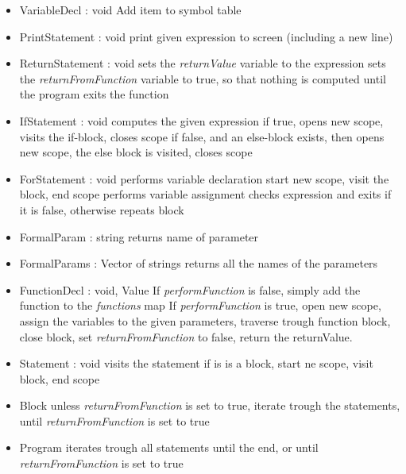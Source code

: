 \begin{itemize}
	\item VariableDecl : void
		\subitem Add item to symbol table
	\item PrintStatement : void
		\subitem print given expression to screen (including a new line)
	\item ReturnStatement : void
		\subitem sets the \textit{returnValue} variable to the expression
		\subitem sets the \textit{returnFromFunction} variable to true, so that nothing is computed until the program exits the function
	\item IfStatement : void
		\subitem computes the given expression
		\subitem if true, opens new scope, visits the if-block, closes scope
		\subitem if false, and an else-block exists, then opens new scope, the else block is visited, closes scope
	\item ForStatement : void
		\subitem performs variable declaration
		\subitem start new scope, visit the block, end scope
		\subitem performs variable assignment
		\subitem checks expression and exits if it is false, otherwise repeats block
	\item FormalParam : string
		\subitem returns name of parameter
	\item FormalParams : Vector of strings
		\subitem returns all the names of the parameters
	\item FunctionDecl : void, Value
		\subitem If \textit{performFunction} is false, simply add the function to the \textit{functions} map
		\subitem If \textit{performFunction} is true, open new scope, assign the variables to the given parameters, traverse trough function block, close block, set \textit{returnFromFunction} to false, return the returnValue.
	\item Statement : void
		\subitem visits the statement
		\subitem if is is a block, start ne scope, visit block, end scope
	\item Block
		\subitem unless \textit{returnFromFunction} is set to true, iterate trough the statements, until \textit{returnFromFunction} is set to true
	\item Program
		\subitem iterates trough all statements until the end, or until \textit{returnFromFunction} is set to true
\end{itemize}

